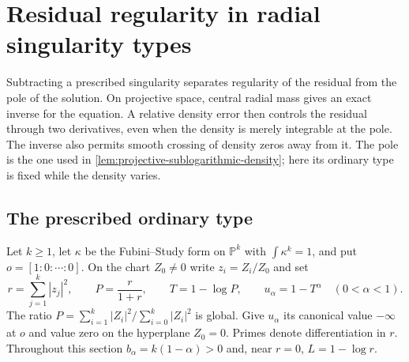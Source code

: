 \section{Residual regularity in radial singularity types}
\label{sec:radial-residual-regularity}

Subtracting a prescribed singularity separates regularity of the residual from the pole of the solution. On projective space, central radial mass gives an exact inverse for the equation. A relative density error then controls the residual through two derivatives, even when the density is merely integrable at the pole. The inverse also permits smooth crossing of density zeros away from it. The pole is the one used in \cref{lem:projective-sublogarithmic-density}; here its ordinary type is fixed while the density varies.

\subsection{The prescribed ordinary type}
Let $k\geq1$, let $\kappa$ be the Fubini--Study form on $\mathbb P^k$ with $\int\kappa^k=1$, and put $o=[1:0:\cdots:0]$. On the chart $Z_0\ne0$ write $z_i=Z_i/Z_0$ and set
\[
 r=\sum_{j=1}^k|z_j|^2,\qquad P=\frac r{1+r},\qquad
 T=1-\log P,
 \qquad u_\alpha=1-T^\alpha\quad(0<\alpha<1).
\]
The ratio $P=\sum_{i=1}^k|Z_i|^2/\sum_{i=0}^k|Z_i|^2$ is global. Give $u_\alpha$ its canonical value $-\infty$ at $o$ and value zero on the hyperplane $Z_0=0$. Primes denote differentiation in $r$. Throughout this section $b_\alpha=k(1-\alpha)>0$ and, near $r=0$, $L=1-\log r$.

